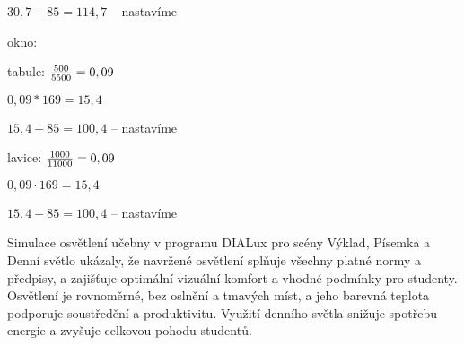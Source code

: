         $30,7 + 85 = 114,7$ – nastavíme

{\sbf okno:}


tabule: ${500 \over 5500} = 0,09$

        ${0,09 * 169} = 15,4$
        
        $15,4 + 85 = 100,4$ – nastavíme

lavice: ${1000 \over 11000} = 0,09$

        ${0,09 \cdot 169} = 15,4$
        
        $15,4 + 85 = 100,4$ – nastavíme


Simulace osvětlení učebny v programu DIALux pro scény Výklad, Písemka a Denní světlo ukázaly, že navržené osvětlení
splňuje všechny platné normy a předpisy, a zajišťuje optimální vizuální komfort a vhodné podmínky pro studenty.
Osvětlení je rovnoměrné, bez oslnění a tmavých míst, a jeho barevná teplota podporuje soustředění a produktivitu.
Využití denního světla snižuje spotřebu energie a zvyšuje celkovou pohodu studentů.





